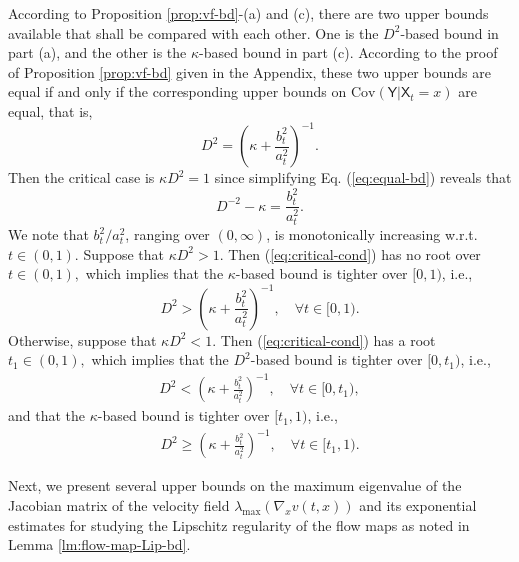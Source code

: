 \documentclass[twoside,11pt]{article}
\newcommand{\Cov}{\mathrm{Cov}}
\def\paref#1{(\ref{#1})}
\numberwithin{equation}{section}
\begin{document}
According to Proposition \ref{prop:vf-bd}-(a) and (c), there are two upper bounds available that shall be compared with each other. One is the $D^2$-based bound in part (a), and the other is the $\kappa$-based bound in part (c). According to the proof of Proposition \ref{prop:vf-bd} given in the Appendix, these two upper bounds are equal if and only if the corresponding upper bounds on $\Cov (\mathsf{Y} | \mathsf{X}_t = x)$ are equal, that is,
\begin{equation}
    \label{eq:equal-bd}
    D^2 = \left( \kappa + \frac{b_t^2}{a_t^2} \right)^{-1}.
\end{equation}
Then the critical case is $\kappa D^2 = 1$ since simplifying Eq. \paref{eq:equal-bd} reveals that
\begin{equation}
    \label{eq:critical-cond}
    D^{-2} - \kappa = \frac{b_t^2}{a_t^2}.
\end{equation}
We note that $b_t^2 / a_t^2$, ranging over $(0, \infty)$, is monotonically increasing
w.r.t. $t \in (0, 1)$. Suppose that $\kappa D^2 > 1$. Then \paref{eq:critical-cond} has no root over
$t \in (0, 1), $ which implies that the $\kappa$-based bound is tighter over $[0, 1)$, i.e.,
\begin{equation*}
    D^2 > \left( \kappa + \frac{b_t^2}{a_t^2} \right)^{-1}, \quad \forall t \in [0, 1).
\end{equation*}
Otherwise, suppose that $\kappa D^2 < 1$. Then \paref{eq:critical-cond} has a root
$t_1 \in (0, 1),$
which implies that the $D^2$-based bound is tighter over $[0, t_1)$, i.e.,
\begin{align*}
    D^2 < \left( \kappa + \frac{b_t^2}{a_t^2} \right)^{-1}, \quad \forall t \in [0, t_1),
\end{align*}
and that the $\kappa$-based bound is tighter over $[t_1, 1)$, i.e.,
\begin{align*}
    D^2 \ge \left( \kappa + \frac{b_t^2}{a_t^2} \right)^{-1}, \quad \forall t \in [t_1, 1).
\end{align*}


Next, we present several upper bounds on the maximum eigenvalue of the Jacobian matrix of the velocity field $\lambda_{\max} (\nabla_x  v(t, x))$ and its exponential estimates for studying the Lipschitz regularity of the flow maps as noted in
Lemma \ref{lm:flow-map-Lip-bd}.
\end{document}
